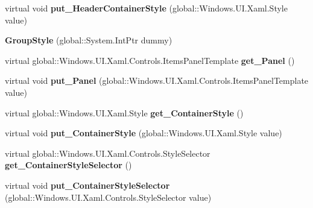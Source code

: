 \begin{DoxyCompactItemize}
virtual void {\bfseries put\+\_\+\+Header\+Container\+Style} (global\+::\+Windows.\+U\+I.\+Xaml.\+Style value)
\item 
\mbox{\label{class_windows_1_1_u_i_1_1_xaml_1_1_controls_1_1_group_style_a48ddd6c81df5d4b20a17360153322649}} 
{\bfseries Group\+Style} (global\+::\+System.\+Int\+Ptr dummy)
\item 
\mbox{\label{class_windows_1_1_u_i_1_1_xaml_1_1_controls_1_1_group_style_a3c268ef18089368deaadd594eb77b93f}} 
virtual global\+::\+Windows.\+U\+I.\+Xaml.\+Controls.\+Items\+Panel\+Template {\bfseries get\+\_\+\+Panel} ()
\item 
\mbox{\label{class_windows_1_1_u_i_1_1_xaml_1_1_controls_1_1_group_style_abdff045e22bd9e3c822ebdbb721ca0cd}} 
virtual void {\bfseries put\+\_\+\+Panel} (global\+::\+Windows.\+U\+I.\+Xaml.\+Controls.\+Items\+Panel\+Template value)
\item 
\mbox{\label{class_windows_1_1_u_i_1_1_xaml_1_1_controls_1_1_group_style_aca3b627e4f154a3c71dfb861be9a9d70}} 
virtual global\+::\+Windows.\+U\+I.\+Xaml.\+Style {\bfseries get\+\_\+\+Container\+Style} ()
\item 
\mbox{\label{class_windows_1_1_u_i_1_1_xaml_1_1_controls_1_1_group_style_abb8477a846bdaf75ee930b67c2f7d88d}} 
virtual void {\bfseries put\+\_\+\+Container\+Style} (global\+::\+Windows.\+U\+I.\+Xaml.\+Style value)
\item 
\mbox{\label{class_windows_1_1_u_i_1_1_xaml_1_1_controls_1_1_group_style_a2de61fd35bfccb41a006bc9635ed88ec}} 
virtual global\+::\+Windows.\+U\+I.\+Xaml.\+Controls.\+Style\+Selector {\bfseries get\+\_\+\+Container\+Style\+Selector} ()
\item 
\mbox{\label{class_windows_1_1_u_i_1_1_xaml_1_1_controls_1_1_group_style_a87a315fbb444d0a30f115de2f3729cc7}} 
virtual void {\bfseries put\+\_\+\+Container\+Style\+Selector} (global\+::\+Windows.\+U\+I.\+Xaml.\+Controls.\+Style\+Selector value)

\end{DoxyCompactItemize}
